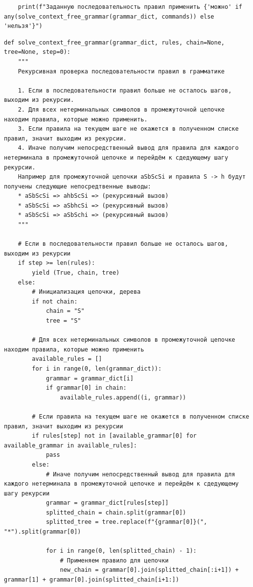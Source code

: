\documentclass[a4paper,14pt]{extarticle}
\begin{document}
\begin{enumerate}[1.]
\begin{verbatim}
    print(f"Заданную последовательность правил применить {'можно' if any(solve_context_free_grammar(grammar_dict, commands)) else 'нельзя'}")
\end{verbatim}
          \begin{verbatim}
def solve_context_free_grammar(grammar_dict, rules, chain=None, tree=None, step=0):
    """
    Рекурсивная проверка последовательности правил в грамматике
    
    1. Если в последовательности правил больше не осталось шагов, выходим из рекурсии.
    2. Для всех нетерминальных символов в промежуточной цепочке находим правила, которые можно применить.
    3. Если правила на текущем шаге не окажется в полученном списке правил, значит выходим из рекурсии.
    4. Иначе получим непосредственный вывод для правила для каждого нетерминала в промежуточной цепочке и перейдём к сдедующему шагу рекурсии.
    Например для промежуточной цепочки aSbScSi и правила S -> h будут получены следующие непосредтвенные выводы:
    * aSbScSi => ahbScSi => (рекурсивный вызов)
    * aSbScSi => aSbhcSi => (рекурсивный вызов)
    * aSbScSi => aSbSchi => (рекурсивный вызов)
    """

    # Если в последовательности правил больше не осталось шагов, выходим из рекурсии
    if step >= len(rules):
        yield (True, chain, tree)
    else:
        # Инициализация цепочки, дерева
        if not chain:
            chain = "S"
            tree = "S"

        # Для всех нетерминальных символов в промежуточной цепочке находим правила, которые можно применить
        available_rules = []
        for i in range(0, len(grammar_dict)):
            grammar = grammar_dict[i]
            if grammar[0] in chain:
                available_rules.append((i, grammar))

        # Если правила на текущем шаге не окажется в полученном списке правил, значит выходим из рекурсии
        if rules[step] not in [available_grammar[0] for available_grammar in available_rules]:
            pass
        else:
            # Иначе получим непосредственный вывод для правила для каждого нетерминала в промежуточной цепочке и перейдём к сдедующему шагу рекурсии
            grammar = grammar_dict[rules[step]]
            splitted_chain = chain.split(grammar[0])
            splitted_tree = tree.replace(f"{grammar[0]}(", "*").split(grammar[0])

            for i in range(0, len(splitted_chain) - 1):
                # Применяем правило для цепочки
                new_chain = grammar[0].join(splitted_chain[:i+1]) + grammar[1] + grammar[0].join(splitted_chain[i+1:])


\end{verbatim}
\end{enumerate}
\end{document}
